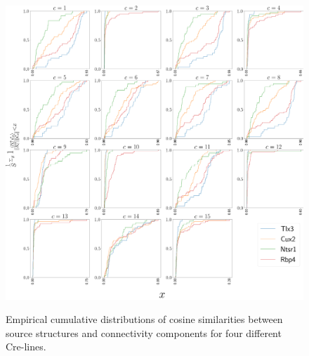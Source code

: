 \begin{figure}[H]
    \centering
    \includegraphics[width = 5in]{figs/component_explanations.png} 
    \label{fig:train_test}
    \caption{Empirical cumulative distributions of cosine similarities between source structures and connectivity components for four different Cre-lines.}
\end{figure}

